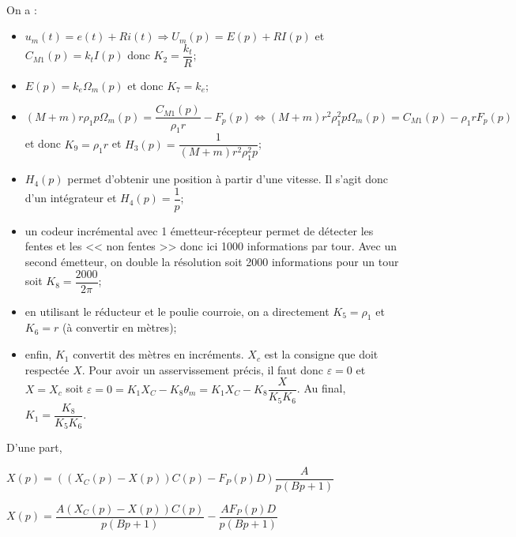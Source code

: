\ifprof
~\\
On a :
\begin{itemize}
\item $ u_m(t)=e(t)+Ri(t) \Rightarrow  U_m(p)=E(p)+RI(p) $ et $C_{M1}(p)=k_t I(p)$ donc $K_2 = \dfrac{k_t}{R}$;
\item $E(p)=k_e\Omega_m(p)$ et donc $K_7 = k_e$;
\item $\left(M+m\right)r\rho_1 p\Omega_m(p)=\dfrac{C_{M1}(p)}{\rho_1 r}-F_p(p) \Leftrightarrow\left(M+m\right)r^2\rho_1^2 p\Omega_m(p)=C_{M1}(p)-\rho_1 rF_p(p) $ et donc $K_9 = \rho_1 r$ et $H_3(p)=\dfrac{1}{\left(M+m\right)r^2\rho_1^2 p}$;
\item  $H_4(p)$ permet d'obtenir une position à partir d'une vitesse. Il s'agit donc d'un intégrateur et $H_4(p)=\dfrac{1}{p}$; 
\item un codeur incrémental avec 1 émetteur-récepteur permet de détecter les fentes et les << non fentes >> donc ici 1000 informations par tour. Avec un second émetteur, on double la résolution soit 2000 informations pour un tour soit $K_8  = \dfrac{2000}{2\pi}$;
\item en utilisant le réducteur et le poulie courroie, on a directement $K_5=\rho_1$ et $K_6=r$ (à convertir en mètres);
\item enfin, $K_1$ convertit des mètres en incréments. $X_c$ est la consigne que doit respectée $X$. Pour avoir un asservissement précis, il faut donc $\varepsilon = 0$ et $X=X_c$ soit $\varepsilon = 0 = K_1 X_C - K_8 \theta_m = K_1 X_C - K_8 \dfrac{X}{K_5 K_6}$. Au final, $K_1 =\dfrac{K_8}{K_5 K_6}$.
\end{itemize}
\else
\fi


\ifprof
D'une part,

$X(p)=\left(\left(X_C(p)-X(p)\right)C(p)-F_P(p) D \right)\dfrac{A}{p\left(Bp+1\right)}$

$X(p)=\dfrac{A\left(X_C(p)-X(p)\right)C(p)}{p\left(Bp+1\right)}- \dfrac{AF_P(p) D}{p\left(Bp+1\right)}$

